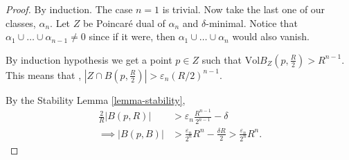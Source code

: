 \begin{proof}
By induction. The case $n=1$ is trivial.
Now take the last one of our classes, $\alpha_n$.
Let $Z$ be Poincaré dual of $\alpha_n$ and $\delta$-minimal.
Notice that $\alpha_1\cup \ldots \cup \alpha_{n-1}\neq 0$
since if it were, then $\alpha_1\cup \ldots\cup \alpha_n$ would also vanish.

By induction hypothesis we get a point $p \in Z$
such that $\text{Vol} B_Z(p,\frac{R}{2}) > R^{n-1}$.
This means that , $|Z \cap B(p,\frac{R}{2})|>\varepsilon_n(R/2)^{n-1}$.

By the Stability Lemma \ref{lemma-stability},
\begin{align*}
\frac{2}{R}|B(p,R)|&>\varepsilon_n\frac{R^{n-1}}{2^{n-1}}-\delta\\
\implies 
|B(p,B)|&>\frac{\varepsilon_n}{2^n}R^n-\frac{\delta R}{2}
> \frac{\varepsilon_n}{2^n}R^n.
\end{align*}
\end{proof}









